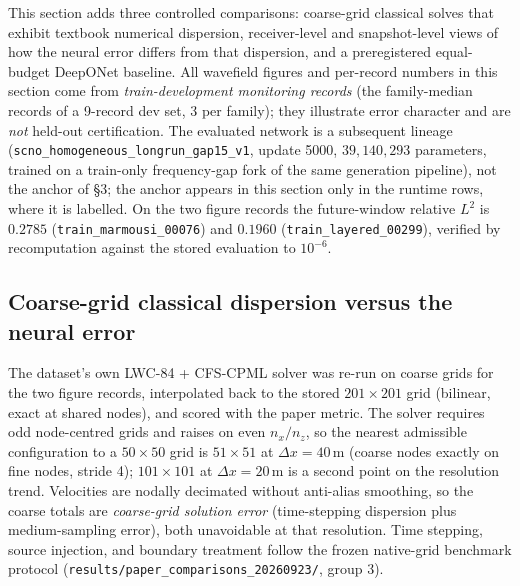 \documentclass[11pt,a4paper]{article}
\begin{document}
This section adds three controlled comparisons: coarse-grid classical solves that exhibit
textbook numerical dispersion, receiver-level and snapshot-level views of how the neural
error differs from that dispersion, and a preregistered equal-budget DeepONet baseline.
All wavefield figures and per-record numbers in this section come from
\emph{train-development monitoring records} (the family-median records of a 9-record
dev set, 3 per family); they illustrate error character and are \emph{not} held-out
certification. The evaluated network is a subsequent lineage
(\texttt{scno\_homogeneous\_longrun\_gap15\_v1}, update 5000, $39{,}140{,}293$ parameters,
trained on a train-only frequency-gap fork of the same generation pipeline), not the
anchor of \S3; the anchor appears in this section only in the runtime rows, where it is
labelled. On the two figure records the future-window relative $L^2$ is $0.2785$
(\texttt{train\_marmousi\_00076}) and $0.1960$ (\texttt{train\_layered\_00299}), verified
by recomputation against the stored evaluation to $10^{-6}$.

\subsection{Coarse-grid classical dispersion versus the neural error}
\label{sec:comp-dispersion}

The dataset's own LWC-84 + CFS-CPML solver was re-run on coarse grids for the two figure
records, interpolated back to the stored $201\times201$ grid (bilinear, exact at shared
nodes), and scored with the paper metric. The solver requires odd node-centred grids and
raises on even $n_x/n_z$, so the nearest admissible configuration to a $50\times50$ grid
is $51\times51$ at $\Delta x=40$\,m (coarse nodes exactly on fine nodes, stride 4);
$101\times101$ at $\Delta x=20$\,m is a second point on the resolution trend. Velocities
are nodally decimated without anti-alias smoothing, so the coarse totals are
\emph{coarse-grid solution error} (time-stepping dispersion plus medium-sampling error),
both unavoidable at that resolution. Time stepping, source injection, and boundary
treatment follow the frozen native-grid benchmark protocol
(\texttt{results/paper\_comparisons\_20260923/}, group 3).
\end{document}
